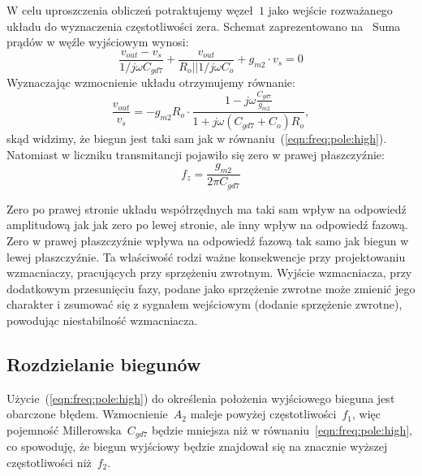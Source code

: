 \documentclass[twoside,pl,final]{labman}
\begin{document}
W celu uproszczenia obliczeń potraktujemy węzeł~$1$
jako wejście rozważanego układu do wyznaczenia częstotliwości zera.
Schemat zaprezentowano na~
Suma prądów w węźle wyjściowym wynosi:
\begin{equation}
  \frac{v_{out} - v_s}{1 / j \omega C_{gd7}} +
  \frac{v_{out}}{R_o || 1 / j \omega C_o} +
  g_{m2} \cdot v_s = 0
\end{equation}
Wyznaczając wzmocnienie układu otrzymujemy równanie:
\begin{equation}
  \frac{v_{out}}{v_{s}} = -g_{m2} R_o \cdot
                          \frac{1 - j \omega \frac{C_{gd7}}{g_{m2}}}
                               {1 + j \omega ( C_{gd7} + C_o ) R_o},
  \label{eqn:freq:rhp:tf}
\end{equation}
skąd widzimy, że biegun jest taki sam jak w
równaniu~(\ref{eqn:freq:pole:high}).
Natomiast w liczniku transmitancji pojawiło się zero w prawej płaszczyźnie:
\begin{equation}
  f_z = \frac{g_{m2}}{2 \pi C_{gd7}}
  \label{eqn:freq:zero}
\end{equation}

Zero po prawej stronie układu współrzędnych
ma taki sam wpływ na odpowiedź amplitudową jak jak zero po lewej stronie,
ale inny wpływ na odpowiedź fazową.
Zero w prawej płaszczyźnie wpływa na odpowiedź fazową
tak samo jak biegun w lewej płaszczyźnie.
Ta właściwość rodzi ważne konsekwencje przy projektowaniu wzmacniaczy,
pracujących przy sprzężeniu zwrotnym.
Wyjście wzmacniacza, przy dodatkowym przesunięciu fazy,
podane jako sprzężenie zwrotne może zmienić jego charakter
i zsumować się z sygnałem wejściowym
(dodanie sprzężenie zwrotne), powodując niestabilność wzmacniacza.

\subsection{Rozdzielanie biegunów}
\label{freq:split}

Użycie~(\ref{eqn:freq:pole:high}) do określenia położenia
wyjściowego bieguna jest obarczone błędem.
Wzmocnienie~$A_2$ maleje powyżej częstotliwości~$f_1$,
więc pojemność Millerowska~$C_{gd7}$ będzie mniejsza
niż w równaniu~\ref{eqn:freq:pole:high},
co spowoduję, że biegun wyjściowy będzie znajdował się
na znacznie wyższej częstotliwości niż~$f_2$.
\end{document}
